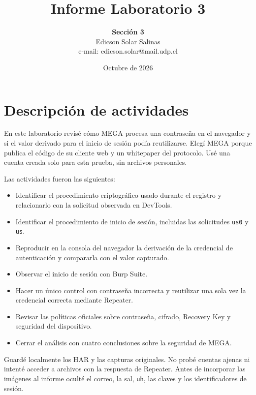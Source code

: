 \documentclass[letterpaper,12pt]{article}
\begin{document}
\title{\Huge{Informe Laboratorio 3}}
\author{\textbf{Sección 3} \\[0.5cm]
Edicson Solar Salinas \\
e-mail: edicson.solar@mail.udp.cl}
\date{Octubre de 2026}

\maketitle
\tableofcontents
\newpage

\section{Descripción de actividades}

En este laboratorio revisé cómo MEGA procesa una contraseña en el navegador y si el valor
derivado para el inicio de sesión podía reutilizarse. Elegí MEGA porque publica el código de
su cliente web y un whitepaper del protocolo. Usé una cuenta creada solo para esta prueba,
sin archivos personales.

Las actividades fueron las siguientes:

\begin{itemize}
  \item Identificar el procedimiento criptográfico usado durante el registro y relacionarlo
  con la solicitud observada en DevTools.
  \item Identificar el procedimiento de inicio de sesión, incluidas las solicitudes
  \texttt{us0} y \texttt{us}.
  \item Reproducir en la consola del navegador la derivación de la credencial de
  autenticación y compararla con el valor capturado.
  \item Observar el inicio de sesión con Burp Suite.
  \item Hacer un único control con contraseña incorrecta y reutilizar una sola vez la
  credencial correcta mediante Repeater.
  \item Revisar las políticas oficiales sobre contraseña, cifrado, Recovery Key y seguridad
  del dispositivo.
  \item Cerrar el análisis con cuatro conclusiones sobre la seguridad de MEGA.
\end{itemize}

Guardé localmente los HAR y las capturas originales. No probé cuentas ajenas ni intenté
acceder a archivos con la respuesta de Repeater. Antes de incorporar las imágenes al informe
oculté el correo, la sal, \texttt{uh}, las claves y los identificadores de sesión.
\end{document}
